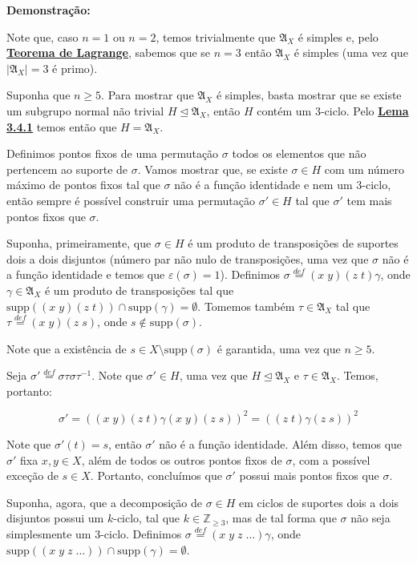 \documentclass[16pt,openany]{book}
\theoremstyle{definition}
\begin{document}
{\color{red}
\textbf{Demonstração:}

Note que, caso $n = 1$ ou $n = 2$, temos trivialmente que $\mathfrak{A}_X$ é simples e, pelo \hyperlink{lagrange}{\textbf{Teorema de Lagrange}}, sabemos que se $n=3$ então $\mathfrak{A}_X$ é simples (uma vez que $\vert \mathfrak{A}_X\vert = 3$ é primo).

Suponha que $n\geq 5$. Para mostrar que $\mathfrak{A}_X$ é simples, basta mostrar que se existe um subgrupo normal não trivial $H\trianglelefteq \mathfrak{A}_X$, então $H$ contém um $3$-ciclo. Pelo \hyperlink{lemalt}{\textbf{Lema 3.4.1}} temos então que $H=\mathfrak{A}_X$.

Definimos pontos fixos de uma permutação $\sigma$ todos os elementos que não pertencem ao suporte de $\sigma$. Vamos mostrar que, se existe $\sigma\in H$ com um número máximo de pontos fixos tal que $\sigma$ não é a função identidade e nem um $3$-ciclo, então sempre é possível construir uma permutação $\sigma'\in H$ tal que $\sigma'$ tem mais pontos fixos que $\sigma$.

Suponha, primeiramente, que $\sigma\in H$ é um produto de transposições de suportes dois a dois disjuntos (número par não nulo de transposições, uma vez que $\sigma$ não é a função identidade e temos que $\varepsilon(\sigma) = 1$). Definimos $\sigma \overset{def}{=} (x\;y)(z\; t)\gamma$, onde $\gamma\in \mathfrak{A}_X$ é um produto de transposições tal que $\text{supp}\left((x\;y)(z\;t)\right)\cap\text{supp}(\gamma) = \emptyset$. Tomemos também $\tau \in \mathfrak{A}_X$ tal que $\tau \overset{def}{=} (x\;y)(z\;s)$, onde $s\notin\text{supp}(\sigma)$.

Note que a existência de $s\in X\setminus\text{supp}(\sigma)$ é garantida, uma vez que $n\geq 5$.

Seja $\sigma' \overset{def}{=} \sigma\tau\sigma\tau^{-1}$. Note que $\sigma'\in H$, uma vez que $H\trianglelefteq \mathfrak{A}_X$ e $\tau\in\mathfrak{A}_X$. Temos, portanto:

\[
\sigma' = \left( (x\; y)(z\; t)\gamma (x\; y)(z\; s)\right)^2 = \left((z\; t)\gamma(z\; s)\right)^2
\]

Note que $\sigma'(t) = s$, então $\sigma'$ não é a função identidade. Além disso, temos que $\sigma'$ fixa $x,y\in X$, além de todos os outros pontos fixos de $\sigma$, com a possível exceção de $s\in X$. Portanto, concluímos que $\sigma'$ possui mais pontos fixos que $\sigma$. 

Suponha, agora, que a decomposição de $\sigma\in H$ em ciclos de suportes dois a dois disjuntos possui um $k$-ciclo, tal que $k\in\mathbb{Z}_{\geq 3}$, mas de tal forma que $\sigma$ não seja simplesmente um $3$-ciclo. Definimos $\sigma \overset{def}{=} (x\;y\;z\; \ldots)\gamma$, onde $\text{supp}\left((x\;y\;z\; \ldots)\right)\cap\text{supp}(\gamma) = \emptyset$.

}
\end{document}

